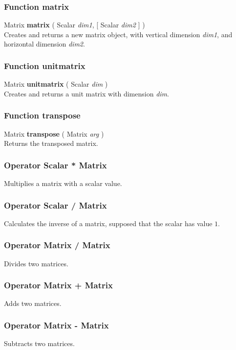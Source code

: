 \documentclass[10pt]{book}
\newcommand{\var}[1]{\textit{#1}}
\begin{document}
\subsubsection{Function matrix \label{F:matrix}}
Matrix \textbf{matrix} ( Scalar \textit{dim1},  [ Scalar \textit{dim2} ] ) \\
Creates and returns a new matrix object, with vertical dimension \var{dim1}, and horizontal dimension \var{dim2}.

\subsubsection{Function unitmatrix \label{F:unitmatrix}}
Matrix \textbf{unitmatrix} ( Scalar \textit{dim} ) \\
Creates and returns a unit matrix with dimension \var{dim}.

\subsubsection{Function transpose \label{F:transpose}}
Matrix \textbf{transpose} ( Matrix \textit{arg} ) \\
Returns the transposed matrix.

\subsubsection{Operator Scalar * Matrix \label{O:Scalar*Matrix}}
Multiplies a matrix with a scalar value.

\subsubsection{Operator Scalar / Matrix \label{O:Scalar/Matrix}}
Calculates the inverse of a matrix, supposed that the scalar has value $1$.

\subsubsection{Operator Matrix / Matrix \label{O:Matrix/Matrix}}
Divides two matrices.

\subsubsection{Operator Matrix + Matrix \label{O:Matrix+Matrix}}
Adds two matrices.

\subsubsection{Operator Matrix - Matrix \label{O:Matrix-Matrix}}
Subtracts two matrices.
\end{document}
